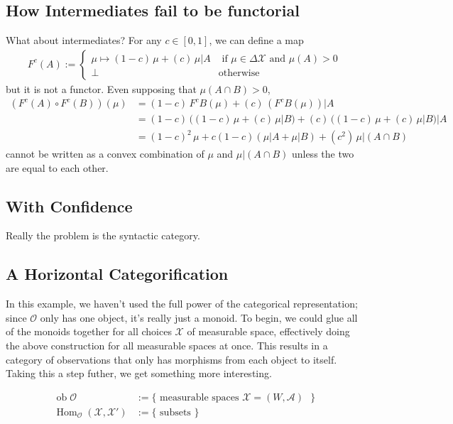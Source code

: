 \documentclass{article}
\DeclareMathOperator{\ob}{\mathrm{ob}}
\DeclareMathOperator{\Hom}{\mathrm{Hom}}
\newcommand\X{\mathcal{X}}
\newcommand\A{\mathcal{A}}
\begin{document}
    \subsection{How Intermediates fail to be functorial}
    What about intermediates?  For any $c \in [0,1]$, we can define a map
    \begin{align*}
        F^c(A
        ) := 
            \begin{cases}
                \mu \mapsto  (1-c)\, \mu + (c)\, \mu| A & \text{ if } \mu  \in \Delta\X \text{ and }\mu(A) > 0 \\
                \bot &\text{otherwise}                
        \end{cases}
    \end{align*}
    but it is not a functor. Even supposing that $\mu(A \cap B) > 0$, 
    \begin{align*}
        (F^c(A) \circ F^c(B))(\mu) 
            &= (1-c)\, F^c B(\mu) + (c)\,(F^c B(\mu))|A \\
            &= (1-c)\, \Big( (1-c)\, \mu + (c)\, \mu| B \Big) + (c)\, 
                \Big((1-c)\, \mu + (c)\, \mu| B\Big)|A \\
            &= (1-c)^2\,\mu + c(1-c) (\mu|A + \mu|B) + (c^2)\, \mu|(A \cap B)
    \end{align*}
    cannot be written as a convex combination of $\mu$ and $\mu|(A\cap B)$ unless the two are equal to each other. 
    
    \subsection{With Confidence}
    Really the problem is the syntactic category. 
    
    
    \subsection*{A Horizontal Categorification}
    In this example, we haven't used the full power of the categorical representation; since $\mathcal O$ only has one object, it's really just a monoid. 
    To begin, we could glue all of the monoids together for all choices $\mathcal X$ of measurable space, effectively doing the above construction for all measurable spaces at once. This results in a category of observations that only has morphisms from each object to itself.     
    Taking this a step futher, we get something more interesting.
    
    \begin{align*}
        \ob \mathcal O &:= 
            \{ \text{ measurable spaces $\mathcal X = (W, \mathcal A)$ } \}\\
        \Hom_{\mathcal O}(\mathcal X, \mathcal X') &:= 
            \Big\{ \text{ subsets } \Big\}
    \end{align*}
\end{document}
